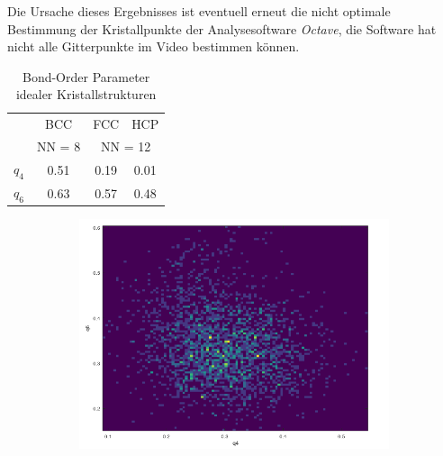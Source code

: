 \documentclass[12pt,a4paper,ngerman]{article}
\begin{document}
\begin{enumerate}[font=\bfseries]
\begin{enumerate}[font=\bfseries, label=\alph*)]
		Die Ursache dieses Ergebnisses ist eventuell erneut die nicht optimale Bestimmung der Kristallpunkte der Analysesoftware \textit{Octave}, die Software hat nicht alle Gitterpunkte im Video bestimmen können.
				\begin{table}[h!]
				\centering
				\begin{tabular}{c c c c  }
					\toprule[1.5pt]
					&BCC & FCC &HCP \\
					& NN = 8 & \multicolumn{2}{c}{NN = 12} \\
					\midrule
					$q_4$& 0.51& 0.19 &0.01 \\
					$q_6$& 0.63& 0.57& 0.48\\
					\bottomrule[1.5pt]
				\end{tabular}
				\caption{Bond-Order Parameter idealer Kristallstrukturen}\label{table:Parameter}
			\end{table}
		\begin{figure}
			\begin{subfigure}[c]{0.5\textwidth}
				
				\includegraphics[width=\textwidth]{data/winkel8.png}
				

\end{subfigure}
\end{figure}
\end{enumerate}
\end{enumerate}
\end{document}
